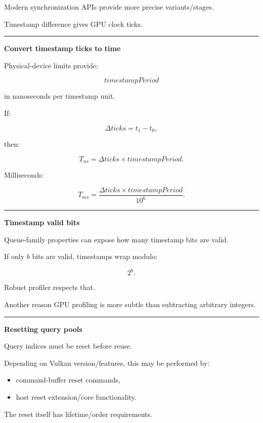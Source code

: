 Modern synchronization APIs provide more precise variants/stages.

Timestamp difference gives GPU clock ticks.

\begin{center}\rule{0.5\linewidth}{0.5pt}\end{center}

\textbf{Convert timestamp ticks to time}

Physical-device limits provide:

\[
timestampPeriod
\]

in nanoseconds per timestamp unit.

If:

\[
\Delta ticks=
t_1-t_0,
\]

then:

\[
\boxed{
T_{ns}
=
\Delta ticks
\times
timestampPeriod.
}
\]

Milliseconds:

\[
T_{ms}
=
\frac{
\Delta ticks\times timestampPeriod
}{
10^6
}.
\]

\begin{center}\rule{0.5\linewidth}{0.5pt}\end{center}

\textbf{Timestamp valid bits}

Queue-family properties can expose how many timestamp bits are valid.

If only \(b\) bits are valid, timestamps wrap modulo:

\[
2^b.
\]

Robust profiler respects that.

Another reason GPU profiling is more subtle than subtracting arbitrary integers.

\begin{center}\rule{0.5\linewidth}{0.5pt}\end{center}

\textbf{Resetting query pools}

Query indices must be reset before reuse.

Depending on Vulkan version/features, this may be performed by:

\begin{itemize}
\tightlist
\item
  command-buffer reset commands,
\item
  host reset extension/core functionality.
\end{itemize}

The reset itself has lifetime/order requirements.

